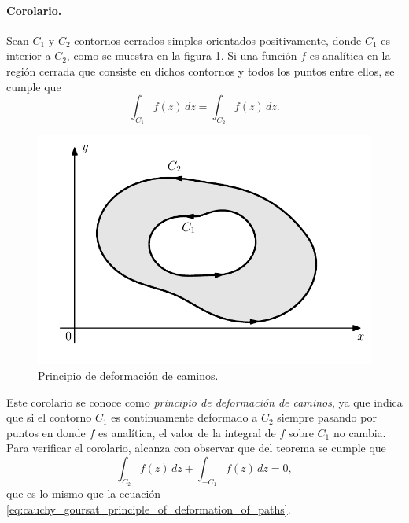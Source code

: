 \documentclass[a4paper]{report}
\begin{document}
\paragraph{Corolario.} Sean \(C_1\) y \(C_2\) contornos cerrados simples orientados positivamente, donde \(C_1\) es interior a \(C_2\), como se muestra en la figura \ref{fig:cauchy_goursat_deformation_principle}. Si una función \(f\) es analítica en la región cerrada que consiste en dichos contornos y todos los puntos entre ellos, se cumple que 
\begin{equation}\label{eq:cauchy_goursat_principle_of_deformation_of_paths}
 \int_{C_1}f(z)\,dz=\int_{C_2}f(z)\,dz. 
\end{equation}

\begin{figure}[!htb]
  \begin{minipage}[c]{0.6\textwidth}
    \includegraphics[width=\textwidth]{figuras/cauchy_goursat_deformation_principle.pdf}
  \end{minipage}\hfill
  \begin{minipage}[c]{0.3\textwidth}
    \caption{
       Principio de deformación de caminos. 
    }\label{fig:cauchy_goursat_deformation_principle}
  \end{minipage}
\end{figure}
Este corolario se conoce como \emph{principio de deformación de caminos}, ya que indica que si el contorno \(C_1\) es continuamente deformado a \(C_2\) siempre pasando por puntos en donde \(f\) es analítica, el valor de la integral de \(f\) sobre \(C_1\) no cambia. Para verificar el corolario, alcanza con observar que del teorema se cumple que 
\[
 \int_{C_2}f(z)\,dz+\int_{-C_1}f(z)\,dz=0,
\]
que es lo mismo que la ecuación \ref{eq:cauchy_goursat_principle_of_deformation_of_paths}.
\end{document}

